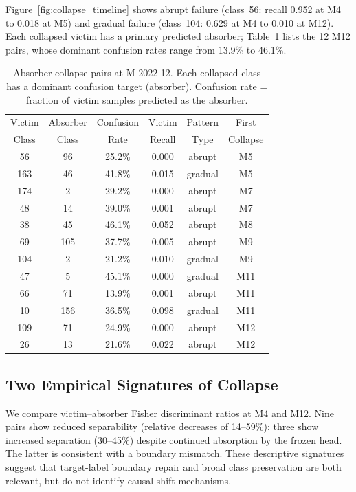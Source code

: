 \documentclass[journal]{IEEEtran}
\begin{document}
Figure~\ref{fig:collapse_timeline} shows abrupt failure (class~56: recall 0.952 at M4 to 0.018 at M5) and gradual failure (class~104: 0.629 at M4 to 0.010 at M12). Each collapsed victim has a primary predicted absorber; Table~\ref{tab:absorber_pairs} lists the 12 M12 pairs, whose dominant confusion rates range from 13.9\% to 46.1\%.

\begin{table}[!htbp]
\centering
\caption{Absorber-collapse pairs at M-2022-12. Each collapsed class has a dominant confusion target (absorber). Confusion rate = fraction of victim samples predicted as the absorber.}
\label{tab:absorber_pairs}
\small
\begin{tabular}{@{}cccccc@{}}
\toprule
Victim & Absorber & Confusion & Victim & Pattern & First \\
Class  & Class    & Rate      & Recall & Type    & Collapse \\
\midrule
56  & 96  & 25.2\% & 0.000 & abrupt  & M5 \\
163 & 46  & 41.8\% & 0.015 & gradual & M5 \\
174 & 2   & 29.2\% & 0.000 & abrupt  & M7 \\
48  & 14  & 39.0\% & 0.001 & abrupt  & M7 \\
38  & 45  & 46.1\% & 0.052 & abrupt  & M8 \\
69  & 105 & 37.7\% & 0.005 & abrupt  & M9 \\
104 & 2   & 21.2\% & 0.010 & gradual & M9 \\
47  & 5   & 45.1\% & 0.000 & gradual & M11 \\
66  & 71  & 13.9\% & 0.001 & abrupt  & M11 \\
10  & 156 & 36.5\% & 0.098 & gradual & M11 \\
109 & 71  & 24.9\% & 0.000 & abrupt  & M12 \\
26  & 13  & 21.6\% & 0.022 & abrupt  & M12 \\
\bottomrule
\end{tabular}
\end{table}


\subsection{Two Empirical Signatures of Collapse}
\label{sec:mechanisms}

We compare victim--absorber Fisher discriminant ratios at M4 and M12. Nine pairs show reduced separability (relative decreases of 14--59\%); three show increased separation (30--45\%) despite continued absorption by the frozen head. The latter is consistent with a boundary mismatch. These descriptive signatures suggest that target-label boundary repair and broad class preservation are both relevant, but do not identify causal shift mechanisms.
\end{document}
